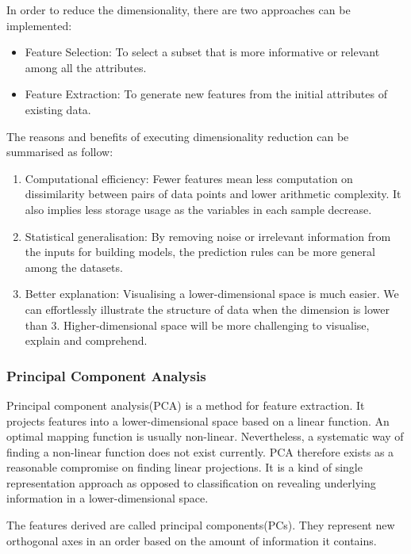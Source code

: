 \documentclass[11pt]{article} %
\theoremstyle{plain}
\theoremstyle{definition}
\begin{document}
In order to reduce the dimensionality, there are two approaches can be implemented:
\begin{itemize}
  \item Feature Selection: To select a subset that is more informative or relevant among all the attributes\cite{hastie/etal:2009}.
  \item Feature Extraction: To generate new features from the initial attributes of existing data\cite{wiki/fe:2018}.
\end{itemize}

The reasons and benefits of executing dimensionality reduction can be summarised as follow:
\begin{enumerate}
  \item Computational efficiency: Fewer features mean less computation on dissimilarity between pairs of data points and lower arithmetic complexity. It also implies less storage usage as the variables in each sample decrease.
  \item Statistical generalisation: By removing noise or irrelevant information from the inputs for building models, the prediction rules can be more general among the datasets.
  \item Better explanation: Visualising a lower-dimensional space is much easier. We can effortlessly illustrate the structure of data when the dimension is lower than 3. Higher-dimensional space will be more challenging to visualise, explain and comprehend.
\end{enumerate}

\subsubsection{Principal Component Analysis}

Principal component analysis(PCA) is a method for feature extraction. It projects features into a lower-dimensional space based on a linear function. An optimal mapping function is usually non-linear. Nevertheless, a systematic way of finding a non-linear function does not exist currently. PCA therefore exists as a reasonable compromise on finding linear projections. It is a kind of single representation approach as opposed to classification on revealing underlying information in a lower-dimensional space.

The features derived are called principal components(PCs). They represent new orthogonal axes in an order based on the amount of information it contains.

\end{document}
